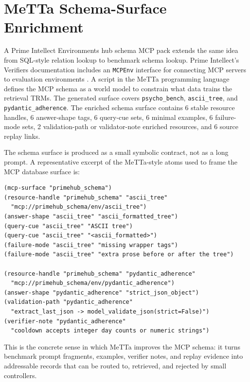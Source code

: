 \documentclass[11pt]{article}
\begin{document}
\section{MeTTa Schema-Surface Enrichment}

A Prime Intellect Environments hub schema MCP pack extends the same idea from SQL-style relation lookup to benchmark schema lookup. Prime Intellect's Verifiers documentation includes an \texttt{MCPEnv} interface for connecting MCP servers to evaluation environments \citep{primeintellect2026verifiers}. A script in the MeTTa programming language defines the MCP schema as a world model to constrain what data trains the retrieval TRMs. The generated surface covers \texttt{psycho\_bench}, \texttt{ascii\_tree}, and \texttt{pydantic\_adherence}. The enriched schema surface contains 6 stable resource handles, 6 answer-shape tags, 6 query-cue sets, 6 minimal examples, 6 failure-mode sets, 2 validation-path or validator-note enriched resources, and 6 source replay links.

The schema surface is produced as a small symbolic contract, not as a long prompt. A representative excerpt of the MeTTa-style atoms used to frame the MCP database surface is:

\begin{lstlisting}[style=metta]
(mcp-surface "primehub_schema")
(resource-handle "primehub_schema" "ascii_tree"
  "mcp://primehub_schema/env/ascii_tree")
(answer-shape "ascii_tree" "ascii_formatted_tree")
(query-cue "ascii_tree" "ASCII tree")
(query-cue "ascii_tree" "<ascii_formatted>")
(failure-mode "ascii_tree" "missing wrapper tags")
(failure-mode "ascii_tree" "extra prose before or after the tree")

(resource-handle "primehub_schema" "pydantic_adherence"
  "mcp://primehub_schema/env/pydantic_adherence")
(answer-shape "pydantic_adherence" "strict_json_object")
(validation-path "pydantic_adherence"
  "extract_last_json -> model_validate_json(strict=False)")
(verifier-note "pydantic_adherence"
  "cooldown accepts integer day counts or numeric strings")
\end{lstlisting}

This is the concrete sense in which MeTTa improves the MCP schema: it turns benchmark prompt fragments, examples, verifier notes, and replay evidence into addressable records that can be routed to, retrieved, and rejected by small controllers.
\end{document}
